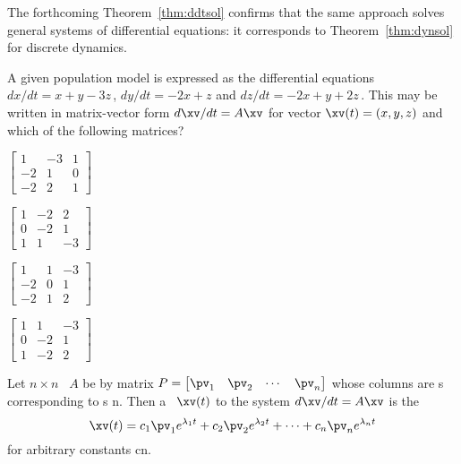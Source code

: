 The forthcoming Theorem~\ref{thm:ddtsol} confirms that the same approach solves general systems of differential equations: it corresponds to Theorem~\ref{thm:dynsol} for discrete dynamics.



\begin{activity}
A given population model is expressed as the differential equations \(dx/dt=x+y-3z\)\,, \(dy/dt=-2x+z\) and \(dz/dt=-2x+y+2z\)\,.
This may be written in matrix-vector form \(d\xv/dt=A\xv\) for vector \(\xv(t)=(x,y,z)\) and which of the following matrices?
\begin{parts}
\item \(\begin{bmatrix} 1&-3&1
\\-2&1&0
\\-2&2&1 \end{bmatrix}\)
\item \(\begin{bmatrix} 1&-2&2
\\0&-2&1
\\1&1&-3 \end{bmatrix}\)
\item\actans \(\begin{bmatrix} 1&1&-3
\\-2&0&1
\\-2&1&2 \end{bmatrix}\)
\item \(\begin{bmatrix} 1&1&-3
\\0&-2&1
\\1&-2&2 \end{bmatrix}\)
\end{parts}
\end{activity}




\begin{theorem} \label{thm:ddtsol}
Let \(n\times n\) ~\(A\) be  by matrix \(P=\begin{bmatrix} \pv_1&\pv_2&\cdots&\pv_n \end{bmatrix}\) whose columns are s corresponding to s \hlist\lambda n.  
Then a ~\(\xv(t)\) to the  system \(d\xv/dt=A\xv\) is the 
\begin{equation}
\xv(t)=c_1\pv_1e^{\lambda_1t}+c_2\pv_2e^{\lambda_2t}+\cdots+c_n\pv_ne^{\lambda_nt}
\label{eq:ddtsol}
\end{equation}
for arbitrary constants \hlist cn.
\end{theorem}

